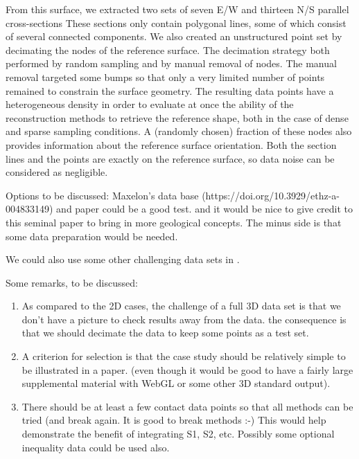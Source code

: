 \documentclass[preprint]{elsarticle}
\begin{document}
From this surface, we extracted two sets of seven E/W and thirteen N/S parallel cross-sections These sections only contain polygonal lines, some of which consist of several connected components. We also created an unstructured point set by decimating the nodes of the reference surface. The decimation strategy both performed by random sampling and by manual removal of nodes. The manual removal targeted some bumps so that only a very limited number of points remained to constrain the surface geometry. The resulting data points have a heterogeneous density in order to evaluate at once the ability of the reconstruction methods to retrieve the reference shape, both in the case of dense and sparse sampling conditions. A (randomly chosen) fraction of these nodes also provides information about the reference surface orientation. Both the section lines and the points are exactly on the reference surface, so data noise can be considered as negligible. 



Options to be discussed: Maxelon's data base (https://doi.org/10.3929/ethz-a-004833149) and paper \citep{Maxelon2009C&G} could be a good test. and it would be nice to give credit to this seminal paper to bring in more geological concepts. The minus side is that some data preparation would be needed. 

We could also use some other challenging data sets in \citep{Laurent2016EaPSL,Grose2019JoSG,Sprague2005Ga}. 

Some remarks, to be discussed: 
\begin{enumerate}
\item As compared to the 2D cases, the challenge of a full 3D data set is that we don't have a picture to check results away from the data. the consequence is that we should decimate the data to keep some points as a test set. 

\item A criterion for selection is that the case study should be relatively simple to be illustrated in a paper. (even though it would be good to have a fairly large supplemental material with WebGL or some other 3D standard output). 

\item There should be at least a few contact data points so that all methods can be tried (and break again. It is good to break methods :-) 
This would help demonstrate the benefit of integrating S1, S2, etc. Possibly some optional inequality data could be used also. 

\end{enumerate}
\end{document}
